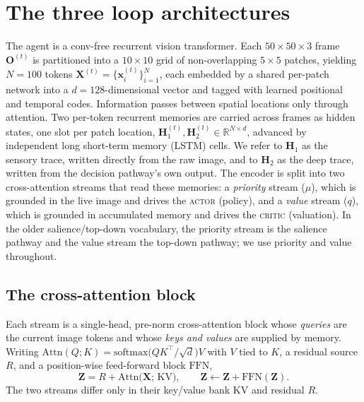 \section{The three loop architectures}
\label{sec:architectures}

The agent is a conv-free recurrent vision transformer. Each $50\times50\times3$ frame $\mathbf{O}^{(t)}$ is partitioned into a $10\times10$ grid of non-overlapping $5\times5$ patches, yielding $N=100$ tokens $\mathbf{X}^{(t)}=\{\mathbf{x}^{(t)}_i\}_{i=1}^{N}$, each embedded by a shared per-patch network into a $d=128$-dimensional vector and tagged with learned positional and temporal codes. Information passes between spatial locations only through attention. Two per-token recurrent memories are carried across frames as hidden states, one slot per patch location, $\mathbf{H}_1^{(t)},\mathbf{H}_2^{(t)}\in\mathbb{R}^{N\times d}$, advanced by independent long short-term memory (LSTM) cells. We refer to $\mathbf{H}_1$ as the sensory trace, written directly from the raw image, and to $\mathbf{H}_2$ as the deep trace, written from the decision pathway's own output. The encoder is split into two cross-attention streams that read these memories: a \emph{priority} stream ($\mu$), which is grounded in the live image and drives the \textsc{actor} (policy), and a \emph{value} stream ($q$), which is grounded in accumulated memory and drives the \textsc{critic} (valuation). In the older salience/top-down vocabulary, the priority stream is the salience pathway and the value stream the top-down pathway; we use priority and value throughout.

\subsection{The cross-attention block}
Each stream is a single-head, pre-norm cross-attention block whose \emph{queries} are the current image tokens and whose \emph{keys and values} are supplied by memory. Writing $\mathrm{Attn}(Q;K)=\mathrm{softmax}\!\big(QK^{\top}/\sqrt{d}\big)V$ with $V$ tied to $K$, a residual source $R$, and a position-wise feed-forward block $\mathrm{FFN}$,
\begin{equation}
\mathbf{Z}=R+\mathrm{Attn}\big(\mathbf{X};\,\mathrm{KV}\big),\qquad \mathbf{Z}\leftarrow\mathbf{Z}+\mathrm{FFN}(\mathbf{Z}).
\label{eq:arch-block}
\end{equation}
The two streams differ only in their key/value bank $\mathrm{KV}$ and residual $R$.

